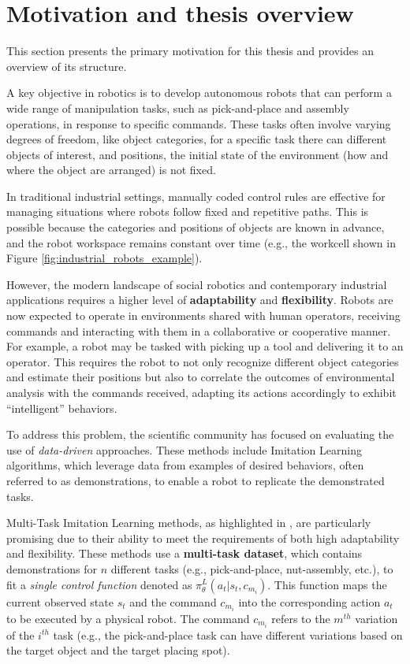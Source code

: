 \section{Motivation and thesis overview}
\label{sec:motivation}
This section presents the primary motivation for this thesis and provides an overview of its structure.

A key objective in robotics is to develop autonomous robots that can perform a wide range of manipulation tasks, such as pick-and-place and assembly operations, in response to specific commands. These tasks often involve varying degrees of freedom, like object categories, for a specific task there can different objects of interest, and positions, the initial state of the environment (how and where the object are arranged) is not fixed.

In traditional industrial settings, manually coded control rules are effective for managing situations where robots follow fixed and repetitive paths. This is possible because the categories and positions of objects are known in advance, and the robot workspace remains constant over time (e.g., the workcell shown in Figure \ref{fig:industrial_robots_example}).

However, the modern landscape of social robotics and contemporary industrial applications requires a higher level of \textbf{adaptability} and \textbf{flexibility}. Robots are now expected to operate in environments shared with human operators, receiving commands and interacting with them in a collaborative or cooperative manner. For example, a robot may be tasked with picking up a tool and delivering it to an operator. This requires the robot to not only recognize different object categories and estimate their positions but also to correlate the outcomes of environmental analysis with the commands received, adapting its actions accordingly to exhibit ``intelligent'' behaviors.



To address this problem, the scientific community has focused on evaluating the use of \textit{data-driven} approaches. These methods include Imitation Learning algorithms, which leverage data from examples of desired behaviors, often referred to as demonstrations, to enable a robot to replicate the demonstrated tasks.

Multi-Task Imitation Learning methods, as highlighted in \cite{jang2022bc_z, dasari2021transformers_one_shot, mandi2022towards_more_generalizable_one_shot, brohan2022rt}, are particularly promising due to their ability to meet the requirements of both high adaptability and flexibility. These methods use a \textbf{multi-task dataset}, which contains demonstrations for $n$ different tasks (e.g., pick-and-place, nut-assembly, etc.), to fit a \textit{single control function} denoted as $\pi^{L}_{\theta}(a_{t}|s_{t}, c_{m_{i}})$. This function maps the current observed state $s_{t}$ and the command $c_{m_{i}}$ into the corresponding action $a_{t}$ to be executed by a physical robot. The command $c_{m_{i}}$ refers to the $m^{th}$ variation of the $i^{th}$ task (e.g., the pick-and-place task can have different variations based on the target object and the target placing spot).

